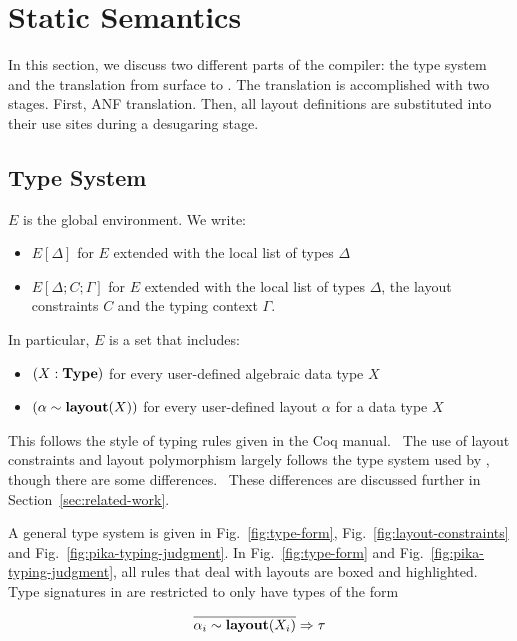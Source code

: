 \section{Static Semantics}

In this section, we discuss two different parts of the \Pika{} compiler: the type system and the translation
from surface \Pika{} to \PikaCore. The translation is accomplished with two stages. First, ANF translation. Then,
all layout definitions are substituted into their use sites during a desugaring stage.

\subsection{\Pika{} Type System}

$E$ is the global environment. We write:

\begin{itemize}
  \item $E[\Delta]$ for $E$ extended with the local list of types $\Delta$
  \item $E[\Delta;C;\Gamma]$ for $E$ extended with the local list of types $\Delta$, the
    layout constraints $C$ and the typing context $\Gamma$.
\end{itemize}

\noindent
In particular, $E$ is a set that includes:
\begin{itemize}
  \item $(X : \textbf{Type})$ for every user-defined algebraic data type $X$
  \item $(\alpha \sim \textbf{layout}(X))$ for every user-defined layout $\alpha$ for a data type $X$
\end{itemize}

\noindent
This follows the style of typing rules given in the Coq manual.~\cite{Coq-typing-rules} The use of layout constraints and layout
polymorphism largely follows the type system used by \Dargent, though there are some differences.~\cite{Dargent} These differences
are discussed further in Section~\ref{sec:related-work}.

A general type system is given in Fig.~\ref{fig:type-form}, Fig.~\ref{fig:layout-constraints} and Fig.~\ref{fig:pika-typing-judgment}. In
Fig.~\ref{fig:type-form} and Fig.~\ref{fig:pika-typing-judgment}, all rules that deal with layouts are boxed and highlighted. Type signatures
in \Pika{} are restricted to only have types of the form

\[
  \overline{\alpha_i \sim \textbf{layout}(X_i)} \Rightarrow \tau
\]


